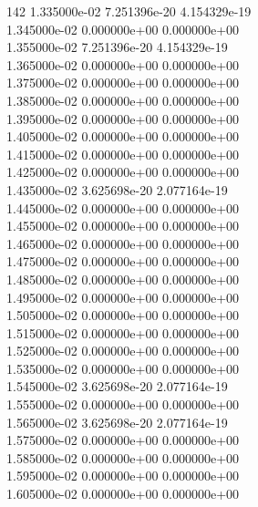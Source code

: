 142	1.335000e-02	7.251396e-20	4.154329e-19	\\ 	1.345000e-02	0.000000e+00	0.000000e+00	\\ 	1.355000e-02	7.251396e-20	4.154329e-19	\\ 	1.365000e-02	0.000000e+00	0.000000e+00	\\ 	1.375000e-02	0.000000e+00	0.000000e+00	\\ 	1.385000e-02	0.000000e+00	0.000000e+00	\\ 	1.395000e-02	0.000000e+00	0.000000e+00	\\ 	1.405000e-02	0.000000e+00	0.000000e+00	\\ 	1.415000e-02	0.000000e+00	0.000000e+00	\\ 	1.425000e-02	0.000000e+00	0.000000e+00	\\ 	1.435000e-02	3.625698e-20	2.077164e-19	\\ 	1.445000e-02	0.000000e+00	0.000000e+00	\\ 	1.455000e-02	0.000000e+00	0.000000e+00	\\ 	1.465000e-02	0.000000e+00	0.000000e+00	\\ 	1.475000e-02	0.000000e+00	0.000000e+00	\\ 	1.485000e-02	0.000000e+00	0.000000e+00	\\ 	1.495000e-02	0.000000e+00	0.000000e+00	\\ 	1.505000e-02	0.000000e+00	0.000000e+00	\\ 	1.515000e-02	0.000000e+00	0.000000e+00	\\ 	1.525000e-02	0.000000e+00	0.000000e+00	\\ 	1.535000e-02	0.000000e+00	0.000000e+00	\\ 	1.545000e-02	3.625698e-20	2.077164e-19	\\ 	1.555000e-02	0.000000e+00	0.000000e+00	\\ 	1.565000e-02	3.625698e-20	2.077164e-19	\\ 	1.575000e-02	0.000000e+00	0.000000e+00	\\ 	1.585000e-02	0.000000e+00	0.000000e+00	\\ 	1.595000e-02	0.000000e+00	0.000000e+00	\\ 	1.605000e-02	0.000000e+00	0.000000e+00	\\ \hline
